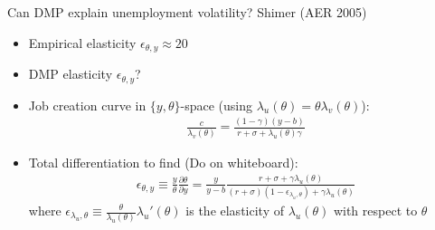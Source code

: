 \documentclass[9pt]{beamer}
\newcommand{\bit}{\begin{itemize}}
\newcommand{\eit}{\end{itemize}}
\newcommand{\rc}{\color{red}}
\begin{document}
\begin{frame}{Can DMP explain unemployment volatility? Shimer (AER 2005)}

\bit
\setlength\itemsep{1.5em}

\item Empirical elasticity $\epsilon_{\theta, y} \approx 20$

\item DMP elasticity $\epsilon_{\theta, y}$?

\item Job creation curve in $\{y, \theta\}$-space (using $\lambda_u(\theta)=\theta \lambda_v(\theta)$):
\begin{eqnarray}
\frac{c}{\lambda_v(\theta)} = \frac{(1-\gamma)(y-b)}{r + \sigma + \lambda_u(\theta) \gamma} \nonumber 
\end{eqnarray} 

\item Total differentiation to find {\rc (Do on whiteboard)}:
\begin{eqnarray}
\epsilon_{\theta, y} \equiv \frac{y}{\theta} \frac{\partial \theta}{\partial y} \nonumber = \frac{y}{y-b} \frac{r+ \sigma + \gamma \lambda_u(\theta)}{(r + \sigma)(1-\epsilon_{\lambda_u,\theta}) + \gamma \lambda_u(\theta)} \nonumber
\end{eqnarray}
where $\epsilon_{\lambda_u,\theta} \equiv \frac{\theta}{\lambda_u(\theta)}\lambda_u'(\theta)$ is the elasticity of $\lambda_u(\theta)$ with respect to $\theta$




\eit
\end{frame}
\end{document}
